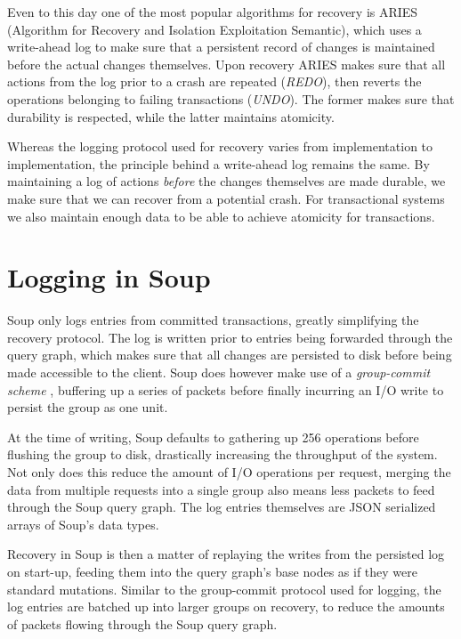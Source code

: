 \documentclass[b5paper]{report}
\begin{document}
Even to this day one of the most popular algorithms for recovery is ARIES
\cite{aries} (Algorithm for Recovery and Isolation Exploitation Semantic), which
uses a write-ahead log to make sure that a persistent record of changes is
maintained before the actual changes themselves. Upon recovery ARIES makes sure
that all actions from the log prior to a crash are repeated (\textit{REDO}),
then reverts the operations belonging to failing transactions (\textit{UNDO}).
The former makes sure that durability is respected, while the latter maintains
atomicity.

Whereas the logging protocol used for recovery varies from implementation to
implementation, the principle behind a write-ahead log remains the same. By
maintaining a log of actions \textit{before} the changes themselves are made
durable, we make sure that we can recover from a potential crash. For
transactional systems we also maintain enough data to be able to achieve
atomicity for transactions.

\section{Logging in Soup}
Soup only logs entries from committed transactions, greatly simplifying the
recovery protocol. The log is written prior to entries being forwarded
through the query graph, which makes sure that all changes are persisted to disk
before being made accessible to the client. Soup does however make use of a
\textit{group-commit scheme} \cite{main-memory}, buffering up a series of
packets before finally incurring an I/O write to persist the group as one unit.

At the time of writing, Soup defaults to gathering up 256 operations before
flushing the group to disk, drastically increasing the throughput of the system.
Not only does this reduce the amount of I/O operations per request, merging the
data from multiple requests into a single group also means less packets to feed
through the Soup query graph. The log entries themselves are JSON \cite{json}
serialized arrays of Soup's data types.

Recovery in Soup is then a matter of replaying the writes from the persisted log
on start-up, feeding them into the query graph's base nodes as if they were
standard mutations. Similar to the group-commit protocol used for logging, the
log entries are batched up into larger groups on recovery, to reduce the amounts
of packets flowing through the Soup query graph.
\end{document}
